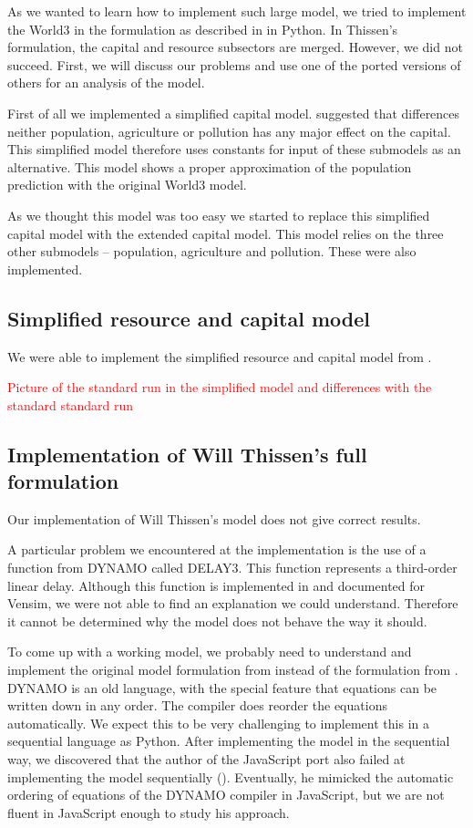 \documentclass[10pt,a4paper]{scrartcl}
\begin{document}
As we wanted to learn how to implement such large model, we tried to implement the World3 in the formulation as described in \cite{thissen1978investigations} in Python. In Thissen's formulation, the capital and resource subsectors are merged. However, we did not succeed. First, we will discuss our problems and use one of the ported versions of others for an analysis of the model.

First of all we implemented a simplified capital model. \cite{thissen1978investigations} suggested that differences neither population, agriculture or pollution has any major effect on the capital. This simplified model therefore uses constants for input of these submodels as an alternative. This model shows a proper approximation of the population prediction with the original World3 model.

As we thought this model was too easy we started to replace this simplified capital model with the extended capital model. This model relies on the three other submodels – population, agriculture and pollution. These were also implemented.

\subsection*{Simplified resource and capital model}

We were able to implement the simplified resource and capital model from \cite{thissen1978investigations}.

\textcolor{red}{Picture of the standard run in the simplified model and differences with the standard standard run}

\subsection*{Implementation of Will Thissen's full formulation}

Our implementation of Will Thissen's model does not give correct results.

A particular problem we encountered at the implementation is the use of a function from DYNAMO called DELAY3. This function represents a third-order linear delay. Although this function is implemented in and documented for Vensim, we were not able to find an explanation we could understand. Therefore it cannot be determined why the model does not behave the way it should.

To come up with a working model, we probably need to understand and implement the original model formulation from \cite{forresterworld} instead of the formulation from \cite{thissen1978investigations}. DYNAMO is an old language, with the special feature that equations can be written down in any order. The compiler does reorder the equations automatically. We expect this to be very challenging to implement this in a sequential language as Python.  After implementing the model in the sequential way, we discovered that the author of the JavaScript port also failed at implementing the model sequentially (\cite{blogpost}). Eventually, he mimicked the automatic ordering of equations of the DYNAMO compiler in JavaScript, but we are not fluent in JavaScript enough to study his approach.
\end{document}
